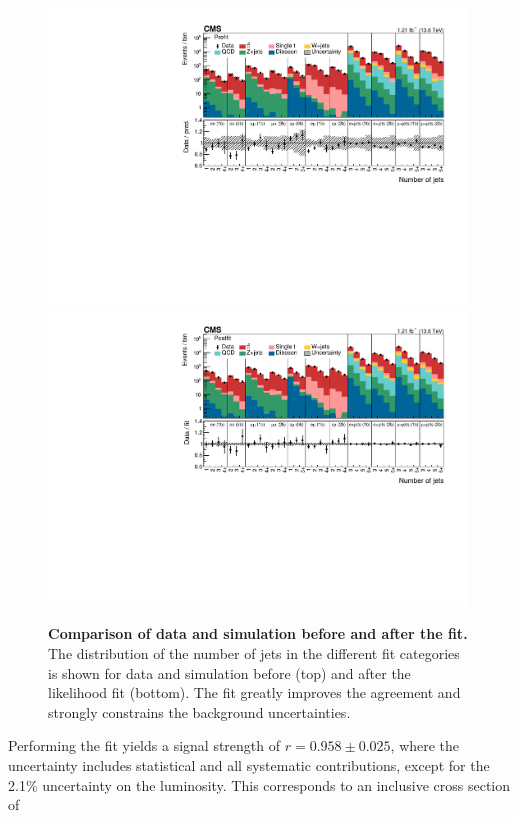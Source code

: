 \begin{figure}[!ht]
\centering
\includegraphics[width=0.99\textwidth]{figures/ttxs/prefithist.pdf}
\includegraphics[width=0.99\textwidth]{figures/ttxs/postfithist.pdf}

\caption{
   \textbf{Comparison of data and simulation before and after the fit.} The distribution of the number of jets in the different fit categories is shown for data and simulation before (top) and after the likelihood fit (bottom). The fit greatly improves the agreement and strongly constrains the background uncertainties.
}
\label{fig:ttxs:prepostfit}
\end{figure}

Performing the fit yields a \ttbar signal strength of $r = 0.958 \pm 0.025$, where the uncertainty includes statistical and all systematic contributions, except for the 2.1\% uncertainty on the luminosity. This corresponds to an inclusive \ttbar cross section of

